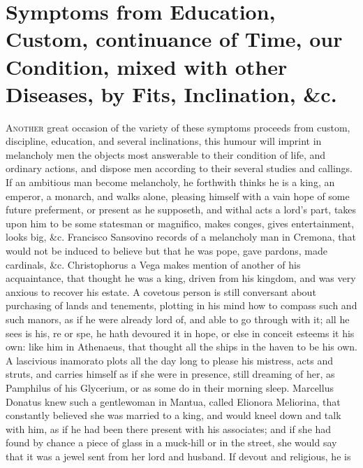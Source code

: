 {%
\section[Symptoms from Education and Custom]{Symptoms from Education, Custom, continuance of Time, our Condition, mixed with other Diseases, by Fits, Inclination, \&c.}

\lettrine{A}{nother} great occasion of the variety of these symptoms proceeds from
custom, discipline, education, and several inclinations, this
humour will imprint in melancholy men the objects most answerable to
their condition of life, and ordinary actions, and dispose men
according to their several studies and callings. If an ambitious man
become melancholy, he forthwith thinks he is a king, an emperor, a
monarch, and walks alone, pleasing himself with a vain hope of some
future preferment, or present as he supposeth, and withal acts a lord's
part, takes upon him to be some statesman or magnifico, makes conges,
gives entertainment, looks big, \&c. Francisco Sansovino records of a
melancholy man in Cremona, that would not be induced to believe but
that he was pope, gave pardons, made cardinals, \&c. Christophorus
a Vega makes mention of another of his acquaintance, that thought he
was a king, driven from his kingdom, and was very anxious to recover
his estate. A covetous person is still conversant about purchasing of
lands and tenements, plotting in his mind how to compass such and such
manors, as if he were already lord of, and able to go through with it;
all he sees is his, re or spe, he hath devoured it in hope, or else in
conceit esteems it his own: like him in Athenaeus, that thought
all the ships in the haven to be his own. A lascivious inamorato plots
all the day long to please his mistress, acts and struts, and carries
himself as if she were in presence, still dreaming of her, as Pamphilus
of his Glycerium, or as some do in their morning sleep. 
Marcellus Donatus knew such a gentlewoman in Mantua, called Elionora
Meliorina, that constantly believed she was married to a king, and
 would kneel down and talk with him, as if he had been there
present with his associates; and if she had found by chance a piece of
glass in a muck-hill or in the street, she would say that it was a
jewel sent from her lord and husband. If devout and religious, he is
}
